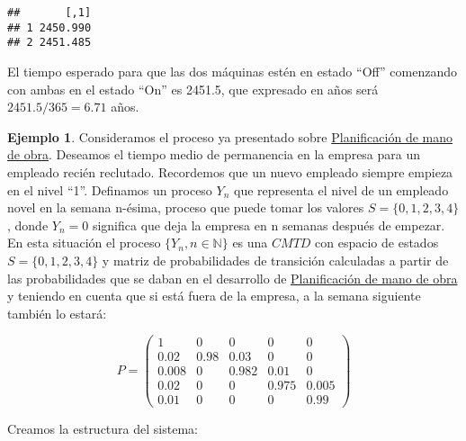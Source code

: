 \documentclass[
]{book}
\theoremstyle{definition}
\theoremstyle{definition}
\newtheorem{example}{Ejemplo}[chapter]
\theoremstyle{definition}
\theoremstyle{definition}
\theoremstyle{remark}
\begin{document}
\begin{verbatim}
##       [,1]
## 1 2450.990
## 2 2451.485
\end{verbatim}

El tiempo esperado para que las dos máquinas estén en estado ``Off'' comenzando con ambas en el estado ``On'' es 2451.5, que expresado en años será \(2451.5/365 = 6.71\) años.

\begin{example}
Consideramos el proceso ya presentado sobre \protect\hyperlink{planificacion}{Planificación de mano de obra}. Deseamos el tiempo medio de permanencia en la empresa para un empleado recién reclutado. Recordemos que un nuevo empleado siempre empieza en el nivel ``1''. Definamos un proceso \(Y_n\) que representa el nivel de un empleado novel en la semana n-ésima, proceso que puede tomar los valores \(S = \{0, 1, 2, 3, 4\}\), donde \(Y_n=0\) significa que deja la empresa en n semanas después de empezar. En esta situación el proceso \(\{Y_n, n \in \mathbb{N}\}\) es una \(CMTD\) con espacio de estados \(S = \{0, 1, 2, 3, 4\}\) y matriz de probabilidades de transición calculadas a partir de las probabilidades que se daban en el desarrollo de \protect\hyperlink{planificacion}{Planificación de mano de obra} y teniendo en cuenta que si está fuera de la empresa, a la semana siguiente también lo estará:

\[P = 
\begin{pmatrix}
1 & 0 & 0 & 0 & 0 \\
0.02 & 0.98 & 0.03 & 0 & 0\\
0.008 & 0 & 0.982 & 0.01 & 0\\
0.02 & 0 & 0 & 0.975 & 0.005\\
0.01 & 0 & 0 & 0 & 0.99
\end{pmatrix}\]
\end{example}

Creamos la estructura del sistema:
\end{document}
